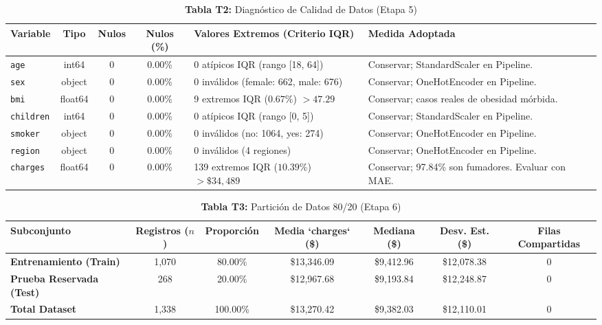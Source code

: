 \documentclass[11pt,a4paper]{article}
\begin{document}
\begin{table}[H]
\centering
\caption{\textbf{Tabla T2:} Diagnóstico de Calidad de Datos (Etapa 5)}
\footnotesize
\begin{tabularx}{\textwidth}{l c c c p{4.2cm} p{4.8cm}}
\toprule
\textbf{Variable} & \textbf{Tipo} & \textbf{Nulos} & \textbf{Nulos (\%)} & \textbf{Valores Extremos (Criterio IQR)} & \textbf{Medida Adoptada} \\
\midrule
\texttt{age} & int64 & 0 & 0.00\% & 0 atípicos IQR (rango [18, 64]) & Conservar; StandardScaler en Pipeline. \\
\texttt{sex} & object & 0 & 0.00\% & 0 inválidos (female: 662, male: 676) & Conservar; OneHotEncoder en Pipeline. \\
\texttt{bmi} & float64 & 0 & 0.00\% & 9 extremos IQR ($0.67\%$) $> 47.29$ & Conservar; casos reales de obesidad mórbida. \\
\texttt{children} & int64 & 0 & 0.00\% & 0 atípicos IQR (rango [0, 5]) & Conservar; StandardScaler en Pipeline. \\
\texttt{smoker} & object & 0 & 0.00\% & 0 inválidos (no: 1064, yes: 274) & Conservar; OneHotEncoder en Pipeline. \\
\texttt{region} & object & 0 & 0.00\% & 0 inválidos (4 regiones) & Conservar; OneHotEncoder en Pipeline. \\
\texttt{charges} & float64 & 0 & 0.00\% & 139 extremos IQR ($10.39\%$) $> \$34,489$ & Conservar; 97.84\% son fumadores. Evaluar con MAE. \\
\bottomrule
\end{tabularx}
\end{table}

\begin{table}[H]
\centering
\caption{\textbf{Tabla T3:} Partición de Datos 80/20 (Etapa 6)}
\footnotesize
\begin{tabularx}{\textwidth}{l c c c c c c}
\toprule
\textbf{Subconjunto} & \textbf{Registros ($n$)} & \textbf{Proporción} & \textbf{Media `charges` (\$)} & \textbf{Mediana (\$)} & \textbf{Desv. Est. (\$)} & \textbf{Filas Compartidas} \\
\midrule
\textbf{Entrenamiento (Train)} & 1,070 & 80.00\% & \$13,346.09 & \$9,412.96 & \$12,078.38 & 0 \\
\textbf{Prueba Reservada (Test)} & 268 & 20.00\% & \$12,967.68 & \$9,193.84 & \$12,248.87 & 0 \\
\textbf{Total Dataset} & 1,338 & 100.00\% & \$13,270.42 & \$9,382.03 & \$12,110.01 & 0 \\
\bottomrule
\end{tabularx}
\end{table}
\end{document}
